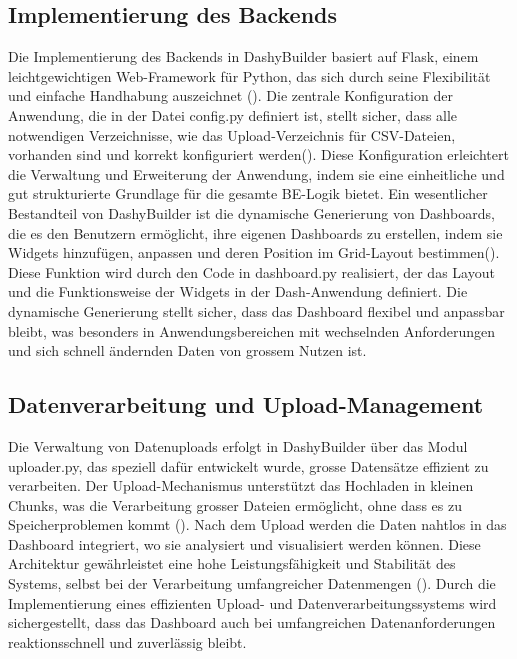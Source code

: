 \documentclass[a4paper, 12pt]{scrartcl}
\begin{document}
\subsection{Implementierung des Backends}
Die Implementierung des Backends in DashyBuilder basiert auf Flask, einem leichtgewichtigen Web-Framework für Python, das sich durch seine Flexibilität und einfache Handhabung auszeichnet (\cite[S.119]{Relan2019}). Die zentrale Konfiguration der Anwendung, die in der Datei config.py definiert ist, stellt sicher, dass alle notwendigen Verzeichnisse, wie das Upload-Verzeichnis für \ac{CSV}-Dateien, vorhanden sind und korrekt konfiguriert werden(\cite{Chauhan2019}). Diese Konfiguration erleichtert die Verwaltung und Erweiterung der Anwendung, indem sie eine einheitliche und gut strukturierte Grundlage für die gesamte \ac{BE}-Logik bietet. Ein wesentlicher Bestandteil von DashyBuilder ist die dynamische Generierung von Dashboards, die es den Benutzern ermöglicht, ihre eigenen Dashboards zu erstellen, indem sie Widgets hinzufügen, anpassen und deren Position im Grid-Layout bestimmen(\cite{Vogel2017}). Diese Funktion wird durch den Code in dashboard.py realisiert, der das Layout und die Funktionsweise der Widgets in der Dash-Anwendung definiert. Die dynamische Generierung stellt sicher, dass das Dashboard flexibel und anpassbar bleibt, was besonders in Anwendungsbereichen mit wechselnden Anforderungen und sich schnell ändernden Daten von grossem Nutzen ist.

\subsection{Datenverarbeitung und Upload-Management}
Die Verwaltung von Datenuploads erfolgt in DashyBuilder über das Modul uploader.py, das speziell dafür entwickelt wurde, grosse Datensätze effizient zu verarbeiten. Der Upload-Mechanismus unterstützt das Hochladen in kleinen Chunks, was die Verarbeitung grosser Dateien ermöglicht, ohne dass es zu Speicherproblemen kommt (\cite{Mallafi2016}). Nach dem Upload werden die Daten nahtlos in das Dashboard integriert, wo sie analysiert und visualisiert werden können. Diese Architektur gewährleistet eine hohe Leistungsfähigkeit und Stabilität des Systems, selbst bei der Verarbeitung umfangreicher Datenmengen (\cite{PGohil2015}). Durch die Implementierung eines effizienten Upload- und Datenverarbeitungssystems wird sichergestellt, dass das Dashboard auch bei umfangreichen Datenanforderungen reaktionsschnell und zuverlässig bleibt.
\end{document}
